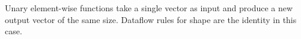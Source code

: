 
Unary element-wise functions take a single vector as input and produce a new
output vector of the same size. Dataflow rules for shape are the identity in this case.

\begin{comment}
\begin{table}[htbp]
\centering
\caption{Rules for unary element-wise functions (E)} \label{rule_elem_unary}
\begin{small}
\begin{tabular}{|c||c|c|c|c|}
\hline
$F_{U}(x)$ & \shapeS & \shapeV{$c_0$} & \shapeV{$d_0$} & \shapeVS{$a_0$} \\ \hline
\hline
Return     & \shapeS & \shapeV{$c_0$} & \shapeV{$d_0$} & \shapeVS{$a_0$} \\ \hline
\end{tabular}
\end{small}
\end{table}
\end{comment}

